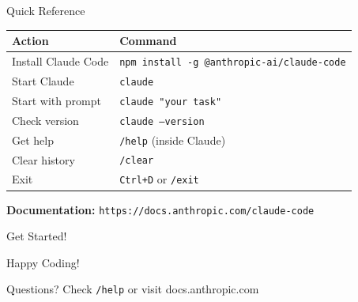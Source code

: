 \documentclass{beamer}
\begin{document}
\begin{frame}{Quick Reference}
    \begin{center}
    \begin{tabular}{|l|l|}
        \hline
        \textbf{Action} & \textbf{Command} \\
        \hline
        Install Claude Code & \texttt{npm install -g @anthropic-ai/claude-code} \\
        Start Claude & \texttt{claude} \\
        Start with prompt & \texttt{claude "your task"} \\
        Check version & \texttt{claude --version} \\
        Get help & \texttt{/help} (inside Claude) \\
        Clear history & \texttt{/clear} \\
        Exit & \texttt{Ctrl+D} or \texttt{/exit} \\
        \hline
    \end{tabular}
    \end{center}

    \vspace{0.5cm}
    \textbf{Documentation:} \texttt{https://docs.anthropic.com/claude-code}
\end{frame}

\begin{frame}{Get Started!}
    \begin{center}
    {\Huge Happy Coding!}

    \vspace{1cm}
    {\large Questions? Check \texttt{/help} or visit docs.anthropic.com}
    \end{center}
\end{frame}
\end{document}
